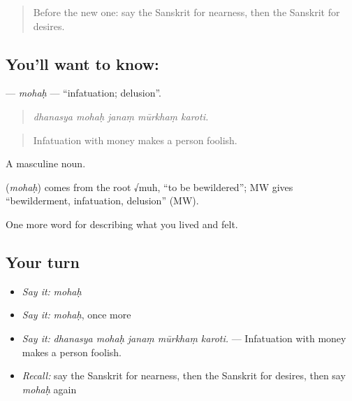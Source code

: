 \begin{quote}
Before the new one: say the Sanskrit for nearness, then the Sanskrit for desires.
\end{quote}

\subsection*{You'll want to know: }
\textbf{} — \emph{mohaḥ} — \textquotedblleft{}infatuation; delusion\textquotedblright{}.

\begin{quote}
    
\end{quote}

\begin{quote}
\emph{dhanasya mohaḥ janaṃ mūrkhaṃ karoti.}
\end{quote}

\begin{quote}
Infatuation with money makes a person foolish.
\end{quote}

A masculine noun.

\begin{cousinweb}
\textbf{} (\emph{mohaḥ}) comes from the root √muh, \textquotedblleft{}to be bewildered\textquotedblright{}; MW gives \textquotedblleft{}bewilderment, infatuation, delusion\textquotedblright{} (MW).
\end{cousinweb}

\begin{grammarlens}[title={What you've built}]
One more word for describing what you lived and felt.
\end{grammarlens}

\subsection*{Your turn}
\begin{itemize}
\raggedright
  \item \emph{Say it:} \emph{mohaḥ}
  \item \emph{Say it:} \emph{mohaḥ}, once more
  \item \emph{Say it:} \emph{dhanasya mohaḥ janaṃ mūrkhaṃ karoti.} — Infatuation with money makes a person foolish.
  \item \emph{Recall:} say the Sanskrit for nearness, then the Sanskrit for desires, then say \emph{mohaḥ} again
\end{itemize}

